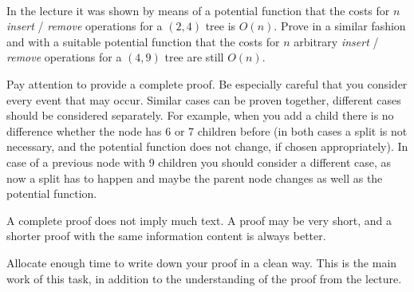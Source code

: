  \\
In the lecture it was shown by means of a potential function that the costs 
for $n$ \emph{insert} /
\emph{remove} operations for a $(2,4)$ tree is $O(n)$.
Prove in a similar fashion and with a suitable potential function that the 
costs for $n$ arbitrary \emph{insert} /
\emph{remove} operations for a $(4,9)$ tree are still $O(n)$.


Pay attention to provide a complete proof. Be especially careful that you 
consider every event that may occur. Similar cases can be proven together, 
different cases should be considered separately.
For example, when you add a child there is no difference whether the
node has 6 or 7 children before (in both cases a split is not necessary, and 
the potential function does not change, if chosen appropriately). In case of a 
previous node with 9 children you should consider a different case, as now a 
split has to happen and maybe the parent node changes as well as the potential 
function.

A complete proof does not imply much text. A proof may be very short, and a 
shorter proof with the same information content is always better.

Allocate enough time to write down your proof in a clean way. This is the main 
work of this task, in addition to the understanding of the proof from the 
lecture.
